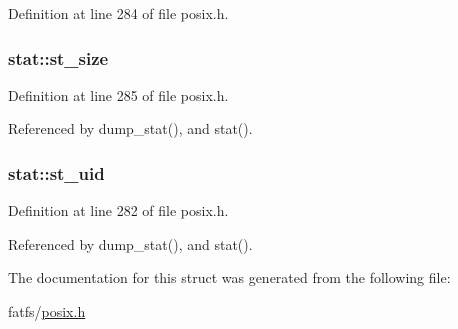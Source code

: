 Definition at line 284 of file posix.\+h.

\subsubsection[{\texorpdfstring{st\+\_\+size}{st_size}}]{ stat\+::st\+\_\+size}\hypertarget{structstat_a040e19c8b9766f841fde8786ce9297bf}{}\label{structstat_a040e19c8b9766f841fde8786ce9297bf}


Definition at line 285 of file posix.\+h.



Referenced by dump\+\_\+stat(), and stat().

\subsubsection[{\texorpdfstring{st\+\_\+uid}{st_uid}}]{ stat\+::st\+\_\+uid}\hypertarget{structstat_a4a8708a3d18be60ee7b2f06c4cab0c70}{}\label{structstat_a4a8708a3d18be60ee7b2f06c4cab0c70}


Definition at line 282 of file posix.\+h.



Referenced by dump\+\_\+stat(), and stat().



The documentation for this struct was generated from the following file\+:\begin{DoxyCompactItemize}
\item 
fatfs/\hyperlink{posix_8h}{posix.\+h}\end{DoxyCompactItemize}
